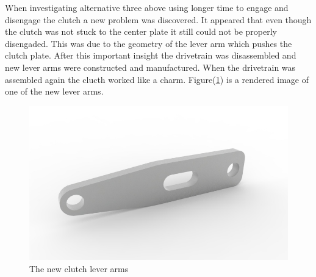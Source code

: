 When investigating alternative three above using longer time to engage and disengage the clutch a new problem was discovered. It appeared that even though the clutch was not stuck to the center plate it still could not be properly disengaded. This was due to the geometry of the lever arm which pushes the clutch plate.  After this important insight the drivetrain was disassembled and new lever arms were constructed and manufactured. When the drivetrain was assembled again the clucth worked like a charm. Figure(\ref{fig:clutch}) is a rendered image of one of the new lever arms.

\begin{figure}[H]
    \centering
    \label{fig:clutch}
    \includegraphics[width=1\textwidth]{./img/clutch}
    \caption{The new clutch lever arms}
\end{figure}


